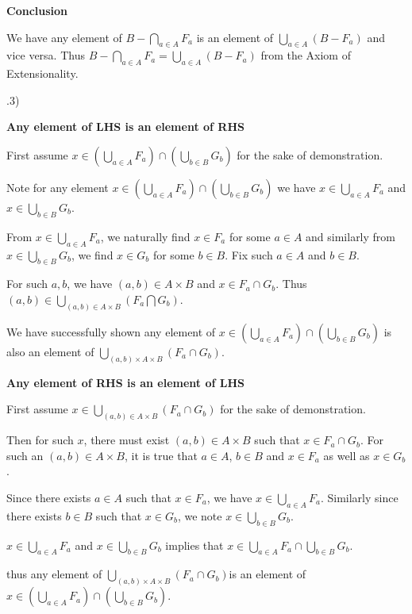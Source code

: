 \documentclass{article}
\begin{document}
\medskip
\textbf{Conclusion}
\medskip

We have any element of $B - \bigcap_{a \in A}F_a$ is an element of $\bigcup_{a \in A}(B - F_a)$ and vice versa. Thus $B - \bigcap_{a \in A}F_a = \bigcup_{a \in A}(B - F_a)$ from the Axiom of Extensionality.

.3)

\medskip
\textbf{Any element of LHS is an element of RHS}
\medskip

First assume $x \in (\bigcup_{a \in A}F_a) \cap (\bigcup_{b \in B}G_b)$ for the sake of demonstration.

\medskip
Note for any element $x \in (\bigcup_{a \in A}F_a) \cap (\bigcup_{b \in B}G_b)$ we have $x \in \bigcup_{a \in A}F_a$ and $x \in \bigcup_{b \in B}G_b$.

\medskip
From $x \in \bigcup_{a \in A}F_a$, we naturally find $x \in F_a$ for some $a \in A$ and similarly from $x \in \bigcup_{b \in B}G_b$, we find $x \in G_b$ for some $b \in B$. Fix such $a \in A$ and $b \in B$.

\medskip
For such $a,b$, we have $(a,b) \in A \times B$ and $x \in F_a \cap G_b$. Thus $(a,b) \in \bigcup_{(a,b) \in A \times B}(F_a \bigcap G_b)$.

\medskip
We have successfully shown any element of $x \in (\bigcup_{a \in A}F_a) \cap (\bigcup_{b \in B}G_b)$ is also an element of $\bigcup_{(a,b) \times A \times B}(F_a \cap G_b)$.

\bigskip
\textbf{Any element of RHS is an element of LHS}
\medskip

First assume $x \in \bigcup_{(a,b) \in A \times B}(F_a \cap G_b)$ for the sake of demonstration.

\medskip
Then for such $x$, there must exist $(a,b) \in A \times B$ such that $x \in F_a \cap G_b$. For such an $(a,b) \in A \times B$, it is true that $a \in A$, $b \in B$ and $x \in F_a$ as well as $x \in G_b$.

\medskip
Since there exists $a \in A$ such that $x \in F_a$, we have $x \in \bigcup_{a \in A}F_a$. Similarly since there exists $b \in B$ such that $x \in G_b$, we note $x \in \bigcup_{b \in B}G_b$.

\medskip
$x \in \bigcup_{a \in A}F_a$ and $x \in \bigcup_{b \in B}G_b$ implies that $x \in \bigcup_{a \in A}F_a \cap \bigcup_{b \in B}G_b$.

\medskip
thus any element of $\bigcup_{(a,b) \times A \times B}(F_a \cap G_b)$is an element of $x \in (\bigcup_{a \in A}F_a) \cap (\bigcup_{b \in B}G_b)$.
\end{document}
